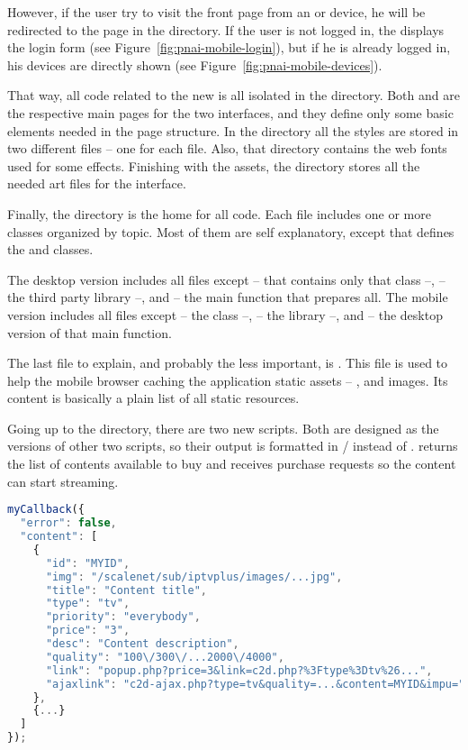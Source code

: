 However, if the user try to visit the front page from an  or  device, he will be redirected to the  page in the  directory.
If the user is not logged in, the  displays the login form (see Figure~\vref{fig:pnai-mobile-login}), but if he is already logged in, his devices are directly shown (see Figure~\vref{fig:pnai-mobile-devices}).

That way, all code related to the new  is all isolated in the  directory.
Both  and  are the respective main pages for the two interfaces, and they define only some basic elements needed in the page structure.
In the  directory all the styles are stored in two different files -- one for each file.
Also, that directory contains the web fonts used for some effects.
Finishing with the assets, the  directory stores all the needed art files for the interface.

Finally, the  directory is the home for all  code.
Each file includes one or more  classes organized by topic.
Most of them are self explanatory, except  that defines the  and  classes.

The desktop version includes all files except  -- that contains only that class --,  -- the third party library --, and  -- the main function that prepares all.
The mobile version includes all files except  -- the  class --,  -- the  library --, and  -- the desktop version of that main function.

The last file to explain, and probably the less important, is .
This file is used to help the mobile browser caching the application static assets -- ,  and images.
Its content is basically a plain list of all static resources.

Going up to the  directory, there are two new  scripts.
Both are designed as the  versions of other two scripts, so their output is formatted in / instead of .
 returns the list of contents available to buy and  receives purchase requests so the content can start streaming.

\begin{lstlisting}[language=JavaScript,label=iptvplusjson,caption=JSON content list example]
myCallback({
  "error": false,
  "content": [
    {
      "id": "MYID",
      "img": "/scalenet/sub/iptvplus/images/...jpg",
      "title": "Content title",
      "type": "tv",
      "priority": "everybody",
      "price": "3",
      "desc": "Content description",
      "quality": "100\/300\/...2000\/4000",
      "link": "popup.php?price=3&link=c2d.php?%3Ftype%3Dtv%26...",
      "ajaxlink": "c2d-ajax.php?type=tv&quality=...&content=MYID&impu="
    },
    {...}
  ]
});
\end{lstlisting}

